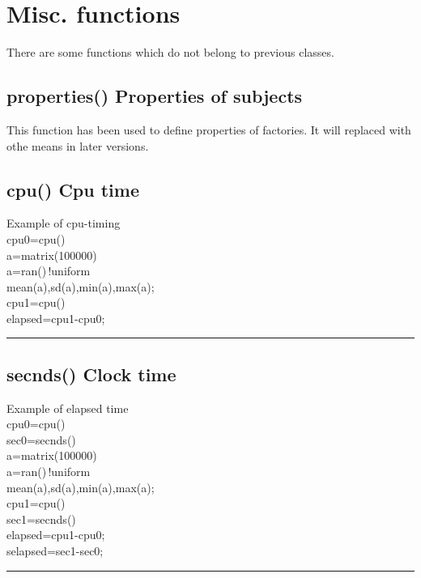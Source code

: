 \section{Misc. functions} 
\label{misc} 
There are some functions which do not belong to previous classes. 
\subsection{\textcolor{VioletRed}{properties}() Properties of subjects} 
\label{properties} 
This function has been used to define properties of factories. 
It will replaced with othe means in later versions. 
\subsection{\textcolor{VioletRed}{cpu}() Cpu time} 
\label{cpu} 
\singlespacing 
\begin{example}[cpuex]Example of cpu-timing\\ 
\label{cpuex} 
\noindent cpu0=\textcolor{VioletRed}{cpu}()\\ 
a=\textcolor{VioletRed}{matrix}(100000)\\ 
a=\textcolor{VioletRed}{ran}()\,{\color{ForestGreen}!uniform}\\ 
\textcolor{VioletRed}{mean}(a),\textcolor{VioletRed}{sd}(a),\textcolor{VioletRed}{min}(a),\textcolor{VioletRed}{max}(a);\\ 
cpu1=\textcolor{VioletRed}{cpu}()\\ 
elapsed=cpu1-cpu0;\\ 
\end{example} 
\vspace{-7mm} \rule{5cm}{0.1pt} 
\onehalfspacing 
\subsection{\textcolor{VioletRed}{secnds}() Clock time} 
\label{secnds} 
\singlespacing 
\begin{example}[secondsex]Example of elapsed time\\ 
\label{secondsex} 
\noindent cpu0=\textcolor{VioletRed}{cpu}()\\ 
sec0=\textcolor{VioletRed}{secnds}()\\ 
a=\textcolor{VioletRed}{matrix}(100000)\\ 
a=\textcolor{VioletRed}{ran}()\,{\color{ForestGreen}!uniform}\\ 
\textcolor{VioletRed}{mean}(a),\textcolor{VioletRed}{sd}(a),\textcolor{VioletRed}{min}(a),\textcolor{VioletRed}{max}(a);\\ 
cpu1=\textcolor{VioletRed}{cpu}()\\ 
sec1=\textcolor{VioletRed}{secnds}()\\ 
elapsed=cpu1-cpu0;\\ 
selapsed=sec1-sec0;\\ 
\end{example} 
\vspace{-7mm} \rule{5cm}{0.1pt} 
\onehalfspacing 
